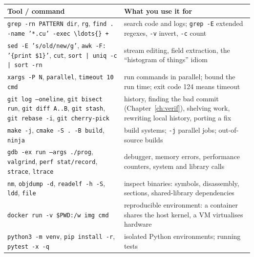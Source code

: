 \documentclass[10pt,a4paper,openany,oneside]{report}
\begin{document}
\begin{center}\small
\begin{xltabular}{\textwidth}{@{}L{4.6cm}Y@{}}
\toprule
\textbf{Tool / command} & \textbf{What you use it for}\\
\midrule\endhead
\texttt{grep -rn PATTERN dir}, \texttt{rg}, \texttt{find . -name '*.cu' -exec \textbackslash{}ldots\{\} +} & search code and logs; \texttt{grep -E} extended regexes, \texttt{-v} invert, \texttt{-c} count\\
\texttt{sed -E 's/old/new/g'}, \texttt{awk -F: '\{print \$1\}'}, \texttt{cut}, \texttt{sort | uniq -c | sort -rn} & stream editing, field extraction, the ``histogram of things'' idiom\\
\texttt{xargs -P N}, \texttt{parallel}, \texttt{timeout 10 cmd} & run commands in parallel; bound the run time; exit code 124 means timeout\\
\texttt{git log --oneline}, \texttt{git bisect run}, \texttt{git diff A..B}, \texttt{git stash}, \texttt{git rebase -i}, \texttt{git cherry-pick} & history, finding the bad commit (Chapter~\ref{ch:verif}), shelving work, rewriting local history, porting a fix\\
\texttt{make -j}, \texttt{cmake -S . -B build}, \texttt{ninja} & build systems; \texttt{-j} parallel jobs; out-of-source builds\\
\texttt{gdb -ex run --args ./prog}, \texttt{valgrind}, \texttt{perf stat/record}, \texttt{strace}, \texttt{ltrace} & debugger, memory errors, performance counters, system and library calls\\
\texttt{nm}, \texttt{objdump -d}, \texttt{readelf -h -S}, \texttt{ldd}, \texttt{file} & inspect binaries: symbols, disassembly, sections, shared-library dependencies\\
\texttt{docker run -v \$PWD:/w img cmd} & reproducible environment: a container shares the host kernel, a VM virtualises hardware\\
\texttt{python3 -m venv}, \texttt{pip install -r}, \texttt{pytest -x -q} & isolated Python environments; running tests\\
\bottomrule
\end{xltabular}
\end{center}
\end{document}
